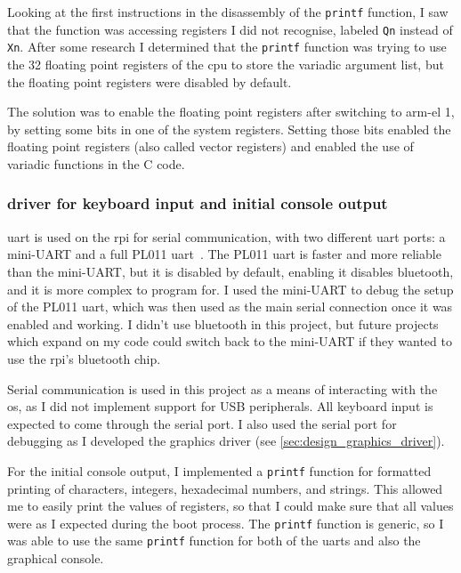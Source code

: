 \documentclass{article}
\begin{document}
Looking at the first instructions in the disassembly of the \verb!printf!
function, I saw that the function was accessing registers I did not recognise,
labeled \texttt{Qn} instead of \texttt{Xn}. After some research I determined
that the \verb!printf! function was trying to use the 32 floating point
registers of the \gls{cpu} to store the variadic argument list, but the
floating point registers were disabled by default.

The solution was to enable the floating point registers after switching to
\gls{arm-el} 1, by setting some bits in one of the system registers. Setting
those bits enabled the floating point registers (also called vector registers)
and enabled the use of variadic functions in the C code.

\subsubsection{\texorpdfstring{}{UART} driver for keyboard
input and initial console output}
\gls{uart} is used on the \gls{rpi} for serial communication, with two
different \gls{uart} ports: a mini-UART and a full PL011
\gls{uart}~\cite{rpi-uarts}. The PL011 \gls{uart} is faster and more reliable
than the mini-UART, but it is disabled by default, enabling it disables
bluetooth, and it is more complex to program for. I used the mini-UART to
debug the setup of the PL011 \gls{uart}, which was then used as the main serial
connection once it was enabled and working. I didn't use bluetooth in this
project, but future projects which expand on my code could switch back to the
mini-UART if they wanted to use the \gls{rpi}'s bluetooth chip.

Serial communication is used in this project as a means of interacting with the
\gls{os}, as I did not implement support for USB peripherals. All keyboard
input is expected to come through the serial port. I also used the serial port
for debugging as I developed the graphics driver (see
\autoref{sec:design_graphics_driver}).

For the initial console output, I implemented a \texttt{printf} function for
formatted printing of characters, integers, hexadecimal numbers, and strings.
This allowed me to easily print the values of registers, so that I could make
sure that all values were as I expected during the boot process. The
\texttt{printf} function is generic, so I was able to use the same
\texttt{printf} function for both of the \glspl{uart} and also the graphical
console.
\end{document}
